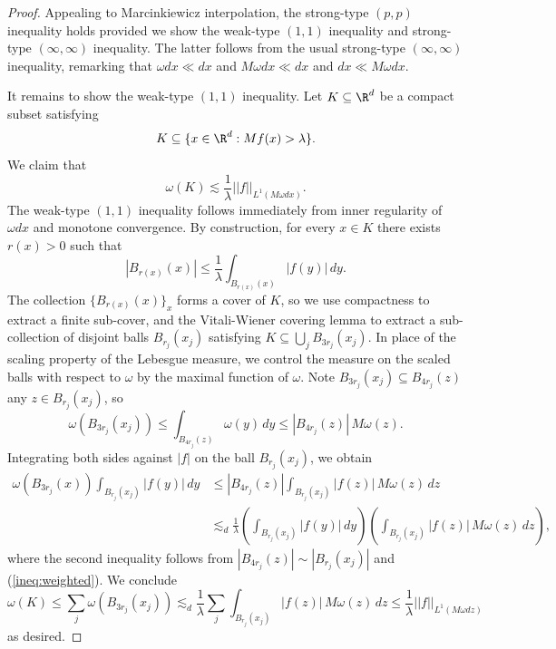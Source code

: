 \documentclass[reqno]{amsart}
\theoremstyle{definition}
\theoremstyle{remark}
\begin{document}
\begin{proof}
	Appealing to Marcinkiewicz interpolation, the strong-type $(p, p)$ inequality holds provided we show the weak-type $(1, 1)$ inequality and strong-type $(\infty, \infty)$ inequality. The latter follows from the usual strong-type $(\infty, \infty)$ inequality, remarking that $\omega dx \ll dx$ and $M\omega dx \ll dx$ and $dx \ll M\omega dx$. 
	
	It remains to show the weak-type $(1, 1)$ inequality. Let $K \subseteq \R^d$ be a compact subset satisfying
		\[ K \subseteq \{ x \in \R^d : Mf(x) > \lambda \}. \]
	We claim that 
		\[ \omega(K) \lesssim \frac1\lambda ||f||_{L^1 (M\omega dx)}. \]
	The weak-type $(1, 1)$ inequality follows immediately from inner regularity of $\omega dx$ and monotone convergence. By construction, for every $x \in K$ there exists $r(x) > 0$ such that 
		\begin{equation}
			 |B_{r(x)} (x)| \leq \frac1\lambda \int_{B_{r(x)} (x)} |f(y)| \, dy. 
			 \tag{*}
			\label{ineq:weighted} 
		\end{equation}	 	
	The collection $\{ B_{r(x)} (x) \}_{x}$ forms a cover of $K$, so we use compactness to extract a finite sub-cover, and the Vitali-Wiener covering lemma to extract a sub-collection of disjoint balls $B_{r_j} (x_j)$ satisfying $K \subseteq \bigcup_j B_{3r_j} (x_j)$. In place of the scaling property of the Lebesgue measure, we control the measure on the scaled balls with respect to $\omega$ by the maximal function of $\omega$. Note $B_{3r_j} (x_j) \subseteq B_{4r_j} (z)$ any $z \in B_{r_j} (x_j)$, so 
		\[ \omega(B_{3r_j} (x_j)) \leq \int_{B_{4r_j} (z)} \omega (y) \, dy \leq |B_{4r_j} (z)| \, M\omega(z). \]
	Integrating both sides against $|f|$ on the ball $B_{r_j} (x_j)$, we obtain	
		\begin{align*}
			 \omega(B_{3r_j} (x)) \int_{B_{r_j}(x_j)} |f(y)| \, dy 
			 	&\leq |B_{4 r_j} (z)| \int_{B_{r_j} (x_j)} |f(z)| \, M\omega (z) \, dz \\
			 	&\lesssim_d \frac1\lambda \left( \int_{B_{r_j} (x_j)} |f(y)| \, dy \right) \left( \int_{B_{r_j} (x_j)} |f(z)| \, M\omega (z) \, dz\right),
		\end{align*}	 
	where the second inequality follows from $|B_{4r_j} (z)| \sim |B_{r_j} (x_j)|$ and (\ref{ineq:weighted}). We conclude
		\[
			\omega(K)
				\leq\sum_j \omega(B_{3r_j} (x_j)) \lesssim_d \frac1\lambda \sum_j \int_{B_{r_j} (x_j)} |f(z)| \, M\omega (z) \, dz \leq \frac1\lambda ||f||_{L^1 (M\omega dz)}
		\]
	as desired. 
\end{proof}
\end{document}
